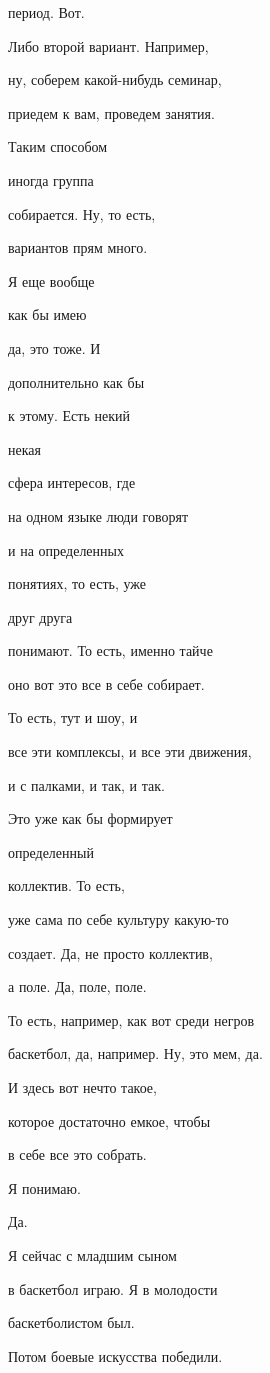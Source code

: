 период. Вот.

Либо второй вариант. Например,

ну, соберем какой-нибудь семинар,

приедем к вам, проведем занятия.

Таким способом

иногда группа

собирается. Ну, то есть,

вариантов прям много.

Я еще вообще

как бы имею

да, это тоже. И

дополнительно как бы

к этому. Есть некий

некая

сфера интересов, где

на одном языке люди говорят

и на определенных

понятиях, то есть, уже

друг друга

понимают. То есть, именно тайче

оно вот это все в себе собирает.

То есть, тут и шоу, и

все эти комплексы, и все эти движения,

и с палками, и так, и так.

Это уже как бы формирует

определенный

коллектив. То есть,

уже сама по себе культуру какую-то

создает. Да, не просто коллектив,

а поле. Да, поле, поле.

То есть, например, как вот среди негров

баскетбол, да, например. Ну, это мем, да.

И здесь вот нечто такое,

которое достаточно емкое, чтобы

в себе все это собрать.

Я понимаю.

Да.

Я сейчас с младшим сыном

в баскетбол играю. Я в молодости

баскетболистом был.

Потом боевые искусства победили.

